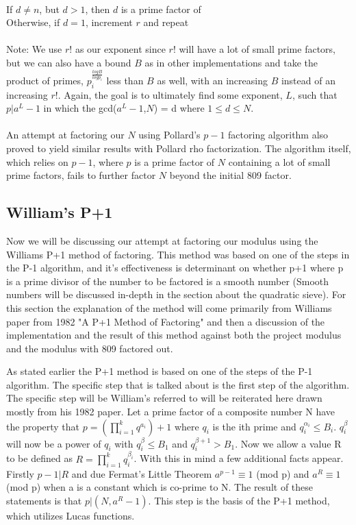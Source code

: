 \documentclass[12pt]{article} %
\begin{document}
	\\If $d \ne n$, but $d > 1$,  then $d$ is a prime factor of 
	\\Otherwise, if $d = 1$, increment $r$ and repeat
	\\\\
	Note: We use $r!$ as our exponent since $r!$ will have a lot of small prime factors, but we can also have a bound $B$ as in other implementations \cite{charest} and take the product of primes, $p_i^{\frac{log B}{logp_i}}$ less than $B$ as well, with an increasing $B$ instead of an increasing $r!$. Again, the goal is to ultimately find some exponent, $L$, such that $p|a^{L}-1$ in which the gcd($a^{L}-1$,$N$) = d where $1\le d\le N$.
	\\\\An attempt at factoring our $N$ using Pollard’s $p-1$ factoring algorithm also proved to yield similar results with Pollard rho factorization. The algorithm itself, which relies on $p-1$, where $p$ is a prime factor of $N$ containing a lot of small prime factors, fails to further factor $N$ beyond the initial 809 factor.
	
	\subsection{William's P+1}
	Now we will be discussing our attempt at factoring our modulus using the Williams P+1 method of factoring. This method was based on one of the steps in the P-1 algorithm, and it's effectiveness is determinant on whether p+1 where p is a prime divisor of the number to be factored is a smooth number (Smooth numbers will be discussed in-depth in the section about the quadratic sieve). For this section the explanation of the method will come primarily from Williams paper from 1982 "A P+1 Method of Factoring" and then a discussion of the implementation and the result of this method against both the project modulus and the modulus with 809 factored out.
	
	\indent As stated earlier the P+1 method is based on one of the steps of the P-1 algorithm. The specific step that is talked about is the first step of the algorithm. The specific step will be William's referred to will be reiterated here drawn mostly from his 1982 paper. Let a prime factor of a composite number N have the property that $p = (\prod^{k}_{i=1}q^{a_i})+1$ where $q_i$ is the ith prime and $q^{\alpha_i}_i\leq B_i$. $q^{\beta}_i$ will now be a power of $q_i$  with $q^{\beta}_i \leq B_1$ and $q^{\beta+1}_i > B_1$. Now we allow a value R to be defined as $R= \prod^{k}_{i=1}q^{\beta _i}_i$. With this in mind a few additional facts appear. Firstly $p-1|R$ and due Fermat's Little Theorem  $a^{p-1} \equiv 1$ (mod p) and $a^{R} \equiv 1$ (mod p) when a is a constant which is co-prime to N. The result of these statements is that $p|(N,a^{R}-1)$. This step is the basis of the P+1 method, which utilizes Lucas functions.
	
\end{document}
